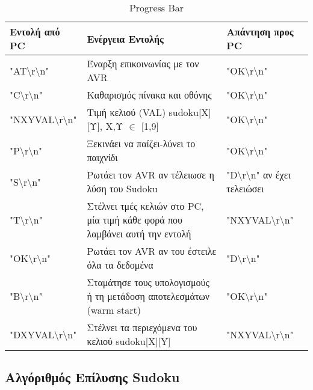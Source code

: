 \documentclass[a4paper,12pt]{article}
\begin{document}
\begin{table}[h!]
\centering
\begin{tabular}[c]{| p{} | p{} | p{} |}
\hline
Εντολή από PC & Ενέργεια Εντολής & Απάντηση προς PC \\
\hline
"AT\textbackslash r\textbackslash n" & Έναρξη επικοινωνίας με τον AVR & "OK\textbackslash r\textbackslash n" \\
\hline
"C\textbackslash r\textbackslash n" & Καθαρισμός πίνακα και οθόνης  & "OK\textbackslash r\textbackslash n" \\
\hline
"NXYVAL\textbackslash r\textbackslash n" &  Τιμή κελιού (VAL) sudoku[Χ][Υ], Χ,Υ $\in$ [1,9] & "OK\textbackslash r\textbackslash n" \\
\hline
"P\textbackslash r\textbackslash n" & Ξεκινάει να παίζει-λύνει το παιχνίδι & "OK\textbackslash r\textbackslash n" \\
\hline
"S\textbackslash r\textbackslash n" & Ρωτάει τον AVR αν τέλειωσε η λύση του Sudoku  & "D\textbackslash r\textbackslash n" αν έχει τελειώσει \\
\hline
"T\textbackslash r\textbackslash n" & Στέλνει τμές κελιών στο PC, μία τιμή κάθε φορά που λαμβάνει αυτή την εντολή & "NXYVAL\textbackslash r\textbackslash n" \\
\hline
"OK\textbackslash r\textbackslash n" & Ρωτάει τον AVR αν του έστειλε όλα τα δεδομένα & "D\textbackslash r\textbackslash n" \\
\hline
"B\textbackslash r\textbackslash n" & Σταμάτησε τους υπολογισμούς ή τη μετάδοση αποτελεσμάτων (warm start) & "OK\textbackslash r\textbackslash n" \\
\hline
"DXYVAL\textbackslash r\textbackslash n" & Στέλνει τα περιεχόμενα του κελιού sudoku[X][Y] & "NXYVAL\textbackslash r\textbackslash n" \\
\hline
\end{tabular}
\caption{Progress Bar}
\label{table:progressBar}
\end{table}




\subsection{Αλγόριθμός Επίλυσης Sudoku}
\end{document}
